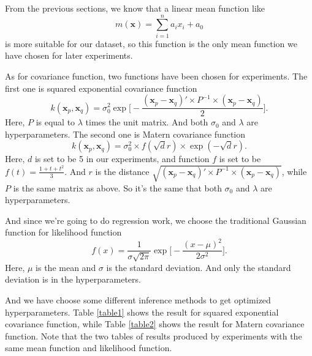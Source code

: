 \documentclass[a4paper]{article}
\newcommand{\bfx}{\mathbf{x}}
\begin{document}
From the previous sections, we know that a linear mean function like
\begin{equation}
m(\bfx)=\sum_{i=1}^n a_ix_i + a_0
\end{equation}
is more suitable for our dataset, so this function is the only mean function we have chosen for later experiments.

As for covariance function, two functions have been chosen for experiments. The first one is squared exponential covariance function
\begin{equation}
k(\bfx_p,\bfx_q)=\sigma_0^2\exp\Big[-\frac{(\bfx_p-\bfx_q)'\times P^{-1} \times (\bfx_p-\bfx_q)}{2}\Big].
\end{equation}
Here, $P$ is equal to $\lambda$ times the unit matrix. And both $\sigma_0$ and $\lambda$ are hyperparameters. The second one is Matern covariance function
\begin{equation}
k(\bfx_p,\bfx_q)=\sigma_0^2\times f(\sqrt{d}r)\times \exp(-\sqrt{d}r).
\end{equation}
Here, $d$ is set to be 5 in our experiments, and function $f$ is set to be $f(t)=\frac{1+t+t^2}{3}$. And $r$ is the distance $\sqrt{(\bfx_p-\bfx_q)'\times P^{-1} \times (\bfx_p-\bfx_q)}$, while $P$ is the same matrix as above. So it's the same that both $\sigma_0$ and $\lambda$ are hyperparameters.

And since we're going to do regression work, we choose the traditional Gaussian function for likelihood function
\begin{equation}
f(x)=\frac{1}{\sigma\sqrt{2\pi}} \exp\Big[ -\frac{(x-\mu)^2}{2\sigma^2} \Big].
\end{equation}
Here, $\mu$ is the mean and $\sigma$ is the standard deviation. And only the standard deviation is in the hyperparameters.

And we have choose some different inference methods to get optimized hyperparameters. Table \ref{table1} shows the result for squared exponential covariance function, while Table \ref{table2} shows the result for Matern covariance function. Note that the two tables of results produced by experiments with the same mean function and likelihood function.
\end{document}
